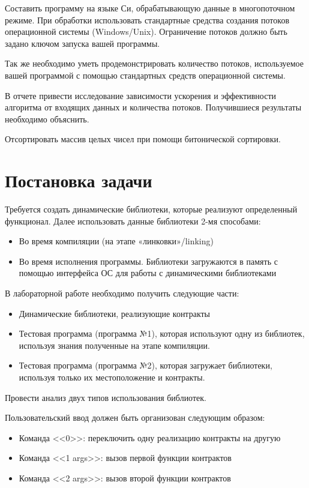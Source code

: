 \documentclass[pdf, unicode, 12pt, a4paper,oneside,fleqn]{article}
\begin{document}
Составить программу на языке Си, обрабатывающую данные в многопоточном
режиме. При обработки использовать стандартные средства создания потоков
операционной системы (Windows/Unix). Ограничение потоков должно быть задано 
ключом запуска вашей программы.

Так же необходимо уметь продемонстрировать количество потоков, используемое 
вашей программой с помощью стандартных средств операционной системы.

В отчете привести исследование зависимости ускорения и эффективности 
алгоритма от входящих данных и количества потоков. Получившиеся результаты 
необходимо объяснить.

Отсортировать массив целых чисел при помощи битонической сортировки.

\section{Постановка задачи}

Требуется создать динамические библиотеки, которые реализуют определенный функционал. 
Далее использовать данные библиотеки 2-мя способами:

\begin{itemize}
    \item Во время компиляции (на этапе «линковки»/linking)
    \item Во время исполнения программы. Библиотеки загружаются в память с помощью 
            интерфейса ОС для работы с динамическими библиотеками
\end{itemize}

В лабораторной работе необходимо получить следующие части:

\begin{itemize}
    \item Динамические библиотеки, реализующие контракты
    \item Тестовая программа (программа №1), которая используют одну из библиотек, используя 
    знания полученные на этапе компиляции.
    \item Тестовая программа (программа №2), которая загружает библиотеки, используя только их 
    местоположение и контракты.
\end{itemize}

Провести анализ двух типов использования библиотек.

Пользовательский ввод должен быть организован следующим образом:

\begin{itemize}
    \item Команда <<0>>: переключить одну реализацию контракты на другую
    \item Команда <<1 args>>: вызов первой функции контрактов
    \item Команда <<2 args>>: вызов второй функции контрактов
\end{itemize}
\end{document}
